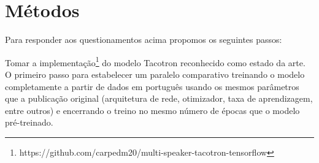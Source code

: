 \documentclass{article}
\begin{document}


\section{Métodos}
Para responder aos questionamentos acima propomos os seguintes passos:

Tomar a implementação\footnote{https://github.com/carpedm20/multi-speaker-tacotron-tensorflow} do modelo Tacotron \cite{tacotron2:DBLP:journals/corr/abs-1712-05884} reconhecido como estado da arte. O primeiro passo para estabelecer um paralelo comparativo treinando o modelo completamente a partir de dados em português usando os mesmos parâmetros que a publicação original (arquitetura de rede, otimizador, taxa de aprendizagem, entre outros) e encerrando o treino no mesmo número de épocas que o modelo pré-treinado.
\end{document}
